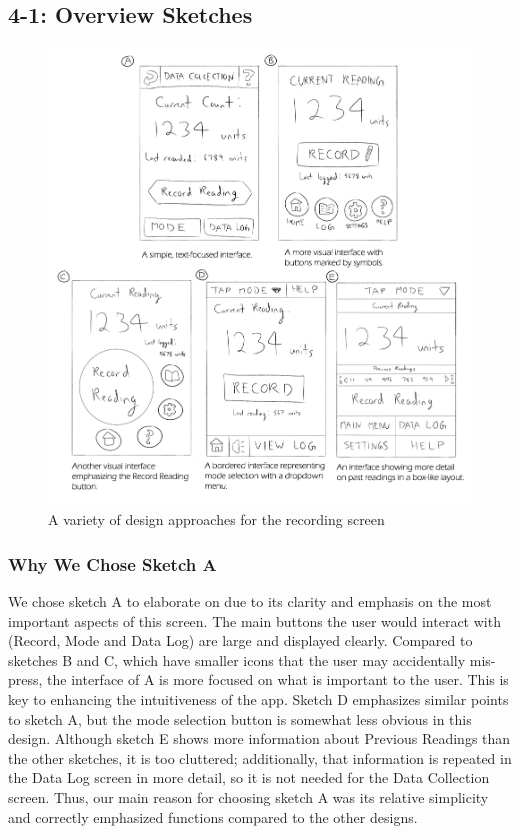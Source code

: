 \documentclass[11pt,a4paper]{article}
\begin{document}
\subsection*{4-1: Overview Sketches}
\bigskip
\begin{figure}[h]
  \centering
      \includegraphics[width=1.1\textwidth]{overviewsketches.png}
  \caption{A variety of design approaches for the recording screen}
\end{figure}

\newpage
\subsubsection*{Why We Chose Sketch A}

We chose sketch A to elaborate on due to its clarity and emphasis on the most important aspects of this screen. The main buttons the user would interact with (Record, Mode and Data Log) are large and displayed clearly. Compared to sketches B and C, which have smaller icons that the user may accidentally mis-press, the interface of A is more focused on what is important to the user. This is key to enhancing the intuitiveness of the app. Sketch D emphasizes similar points to sketch A, but the mode selection button is somewhat less obvious in this design. Although sketch E shows more information about Previous Readings than the other sketches, it is too cluttered; additionally, that information is repeated in the Data Log screen in more detail, so it is not needed for the Data Collection screen. Thus, our main reason for choosing sketch A was its relative simplicity and correctly emphasized functions compared to the other designs.
\end{document}
